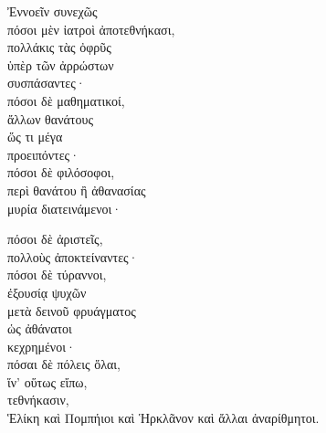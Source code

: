 {\large
\begin{greek}
\noindent Ἐννοεῖν συνεχῶς \\
\tabto{2em} πόσοι μὲν ἰατροὶ ἀποτεθνήκασι, \\
\tabto{4em} πολλάκις τὰς ὀφρῦς \\
\tabto{6em} ὑπὲρ τῶν ἀρρώστων \\
\tabto{4em} συσπάσαντες· \\
\tabto{2em} πόσοι δὲ μαθηματικοί, \\
\tabto{4em} ἄλλων θανάτους \\
\tabto{6em} ὥς τι μέγα \\
\tabto{4em} προειπόντες· \\
\tabto{2em} πόσοι δὲ φιλόσοφοι, \\
\tabto{6em} περὶ θανάτου ἢ ἀθανασίας \\
\tabto{4em} μυρία διατεινάμενοι·

\tabto{2em} πόσοι δὲ ἀριστεῖς, \\
\tabto{4em} πολλοὺς ἀποκτείναντες· \\
\tabto{2em} πόσοι δὲ τύραννοι, \\
\tabto{4em} ἐξουσίᾳ ψυχῶν \\
\tabto{6em} μετὰ δεινοῦ φρυάγματος \\
\tabto{6em} ὡς ἀθάνατοι \\
\tabto{4em} κεχρημένοι· \\
\tabto{2em} πόσαι δὲ πόλεις ὅλαι, \\
\tabto{4em} ἵν' οὕτως εἴπω, \\
\tabto{2em} τεθνήκασιν, \\
\tabto{4em} Ἑλίκη καὶ Πομπήιοι καὶ Ἡρκλᾶνον καὶ ἄλλαι ἀναρίθμητοι.\\

\end{greek}
}

